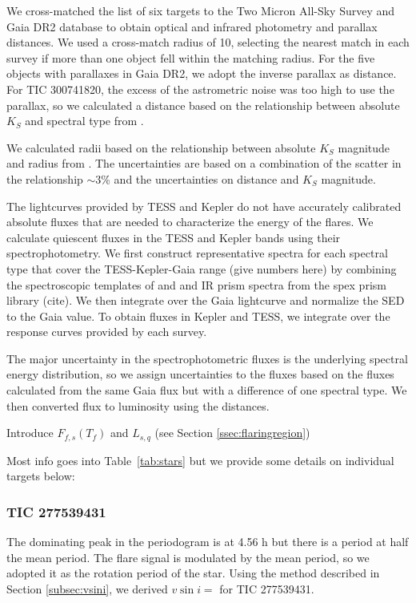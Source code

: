\documentclass[fleqn,usenatbib,letters]{mnras}%
\newcommand{\FA}{TIC 277539431} %
\newcommand{\FF}{TIC 300741820} %
\begin{document}
We cross-matched the list of six targets to the Two Micron All-Sky Survey \citep[2MASS;][]{Skrutskie2006} and Gaia \citep{gaiacollaboration2016} DR2 database \citep{gaiacollaboration2018} to obtain optical and infrared photometry and parallax distances. We used a cross-match radius of 10\arcsec, selecting the nearest match in each survey if more than one object fell within the matching radius. For the five objects with parallaxes in Gaia DR2, we adopt the inverse parallax as distance. For \FF, the excess of the astrometric noise was too high to use the parallax, so we calculated a distance based on the relationship between absolute $K_S$ and spectral type from \citet{dupuy2012}.

We calculated radii based on the relationship between absolute $K_S$ magnitude and radius from \citet{Mann2015}. The uncertainties are based on a combination of the scatter in the relationship $\sim3$\% and the uncertainties on distance and $K_S$ magnitude.

The lightcurves provided by TESS and Kepler do not have accurately calibrated absolute fluxes that are needed to characterize the energy of the flares. We calculate quiescent fluxes in the TESS and Kepler bands using their spectrophotometry. We first construct representative spectra for each spectral type that cover the TESS-Kepler-Gaia range (give numbers here) by combining the spectroscopic templates of \citet{Bochanski2007} and \citet{Schmidt2014a} and IR prism spectra from the spex prism library (cite). We then integrate over the Gaia lightcurve and normalize the SED to the Gaia value. To obtain fluxes in Kepler and TESS, we integrate over the response curves provided by each survey.

The major uncertainty in the spectrophotometric fluxes is the underlying spectral energy distribution, so we assign uncertainties to the fluxes based on the fluxes calculated from the same Gaia flux but with a difference of one spectral type. We then converted flux to luminosity using the distances.

Introduce $F_{f,s}(T_f)$ and $L_{s,q}$ (see Section \ref{ssec:flaringregion})

Most info goes into Table~\ref{tab:stars} but we provide some details on individual targets below:

\subsubsection{\FA}
\label{sec:propsA}
The dominating peak in the periodogram is at 4.56 h but there is a period at half the mean period. The flare signal is modulated by the mean period, so we adopted it as the rotation period of the star.
Using the method described in Section \ref{subsec:vsini}, we derived $v\sin i=$ for \FA.
\end{document}
